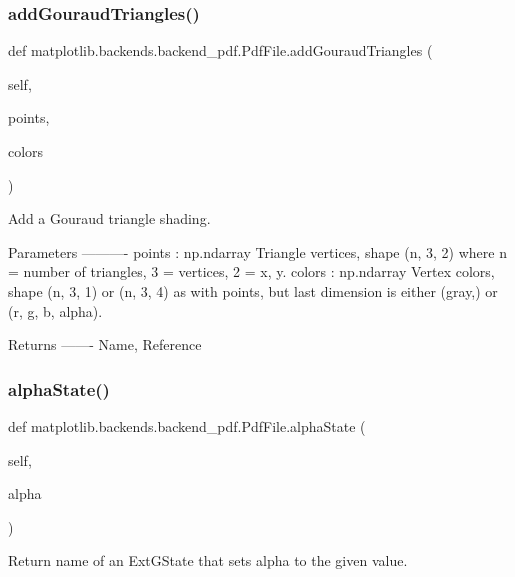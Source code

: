 \subsubsection{\texorpdfstring{add\+Gouraud\+Triangles()}{addGouraudTriangles()}}
{\footnotesize\ttfamily def matplotlib.\+backends.\+backend\+\_\+pdf.\+Pdf\+File.\+add\+Gouraud\+Triangles (\begin{DoxyParamCaption}\item[{}]{self,  }\item[{}]{points,  }\item[{}]{colors }\end{DoxyParamCaption})}

\begin{DoxyVerb}Add a Gouraud triangle shading.

Parameters
----------
points : np.ndarray
    Triangle vertices, shape (n, 3, 2)
    where n = number of triangles, 3 = vertices, 2 = x, y.
colors : np.ndarray
    Vertex colors, shape (n, 3, 1) or (n, 3, 4)
    as with points, but last dimension is either (gray,)
    or (r, g, b, alpha).

Returns
-------
Name, Reference
\end{DoxyVerb}
 \mbox{\label{classmatplotlib_1_1backends_1_1backend__pdf_1_1PdfFile_a4dfc3c22fb7326825ef91690cd3bff07}} 
\subsubsection{\texorpdfstring{alpha\+State()}{alphaState()}}
{\footnotesize\ttfamily def matplotlib.\+backends.\+backend\+\_\+pdf.\+Pdf\+File.\+alpha\+State (\begin{DoxyParamCaption}\item[{}]{self,  }\item[{}]{alpha }\end{DoxyParamCaption})}

\begin{DoxyVerb}Return name of an ExtGState that sets alpha to the given value.\end{DoxyVerb}
 \mbox{\label{classmatplotlib_1_1backends_1_1backend__pdf_1_1PdfFile_a5926ff8af586a3f792b53e1e82b0cadb}} 
